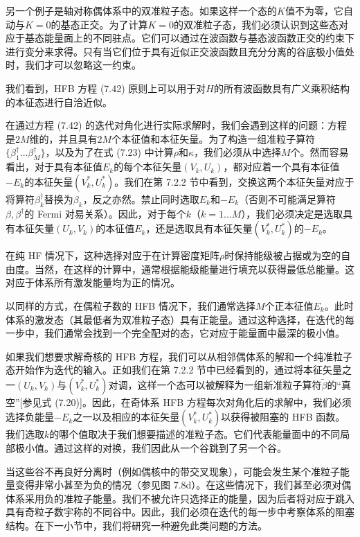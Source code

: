另一个例子是轴对称偶体系中的双准粒子态。如果这样一个态的$K$值不为零，它自动与$K=0$的基态正交。为了计算$K=0$的双准粒子态，我们必须认识到这些态对应于基态能量面上的不同驻点。它们可以通过在波函数与基态波函数正交的约束下进行变分来求得\cite{MSR76,EMR80a}。只有当它们位于具有近似正交波函数且充分分离的谷底极小值处时，我们才可以忽略这一约束。

我们看到，HFB 方程 (7.42) 原则上可以用于对$H$的所有波函数具有广义乘积结构的本征态进行自洽近似。

在通过方程 (7.42) 的迭代对角化进行实际求解时，我们会遇到这样的问题：方程是$2M$维的，并且具有$2M$个本征值和本征矢量。为了构造一组准粒子算符$\{\beta^{\dagger}_{1}\dots\beta^{\dagger}_{M}\}$，以及为了在式
(7.23) 中计算$\rho$和$\kappa$，我们必须从中选择$M$个。然而容易看出，对于具有本征值$E_{k}$的每个本征矢量$(V_{k},U_{k})$，都对应着一个具有本征值$-E_{k}$的本征矢量$(V^{*}_{k},U^{*}_{k})$。我们在第
7.2.2 节中看到，交换这两个本征矢量对应于将算符$\beta^{\dagger}_{k}$替换为$\beta_{k}$，反之亦然。禁止同时选取$E_{k}$和$-E_{k}$（否则不可能满足算符$\beta,\beta^{\dagger}$的
Fermi 对易关系）。因此，对于每个$k$（$k=1\dots M$），我们必须决定是选取具有本征矢量$(U_{k},V_{k})$的本征值$E_{k}$，还是选取具有本征矢量$(V^{*}_{k},U^{*}_{k})$的$-E_{k}$。

在纯 HF 情况下，这种选择对应于在计算密度矩阵$\rho$时保持能级被占据或为空的自由度。当然，在这样的计算中，通常根据能级能量进行填充以获得最低总能量。这对应于体系所有激发能量均为正的情况。

以同样的方式，在偶粒子数的 HFB 情况下，我们通常选择$M$个正本征值$E_{k}$。此时体系的激发态（其最低者为双准粒子态）具有正能量。通过这种选择，在迭代的每一步中，我们通常会找到一个完全配对的态，它对应于能量面中最深的极小值。

如果我们想要求解奇核的 HFB 方程，我们可以从相邻偶体系的解和一个纯准粒子态开始作为迭代的输入。正如我们在第 7.2.2 节中已经看到的，通过将本征矢量之一$(U_{k},V_{k})$与$(V^{*}_{k},U^{*}_{k})$对调，这样一个态可以被解释为一组新准粒子算符$\tilde{\beta}$的“真空”{[}参见式
(7.20){]}。因此，在奇体系 HFB 方程每次对角化后的求解中，我们必须选择负能量$-E_{k}$之一以及相应的本征矢量$(V^{*}_{k},U^{*}_{k})$以获得被阻塞的
HFB 函数。我们选取$k$的哪个值取决于我们想要描述的准粒子态。它们代表能量面中的不同局部极小值。通过这样的对换，我们因此从一个谷跳到了另一个谷。

当这些谷不再良好分离时（例如偶核中的带交叉现象），可能会发生某个准粒子能量变得非常小甚至为负的情况（参见图 7.8d）。在这些情况下，我们甚至必须对偶体系采用负的准粒子能量。我们不被允许只选择正的能量，因为后者将对应于跳入具有奇粒子数宇称的不同谷中。因此，我们必须在迭代的每一步中考察体系的阻塞结构\cite{BMR73}。在下一小节中，我们将研究一种避免此类问题的方法。

